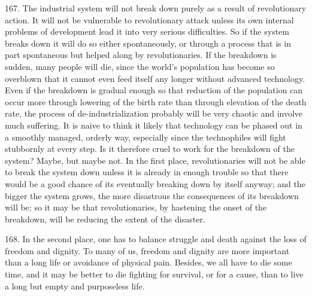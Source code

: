 \documentclass{article}
\begin{document}
\hspace{0.5cm} 167. The industrial system will not break down purely as a result of revolutionary action. It will 
not be vulnerable to revolutionary attack unless its own internal problems of development lead it 
into very serious difficulties. So if the system breaks down it will do so either spontaneously, or 
through a process that is in part spontaneous but helped along by revolutionaries. If the breakdown 
is sudden, many people will die, since the world’s population has become so overblown that it 
cannot even feed itself any longer without advanced technology. Even if the breakdown is gradual 
enough so that reduction of the population can occur more through lowering of the birth rate than 
through elevation of the death rate, the process of de-industrialization probably will be very chaotic 
and involve much suffering. It is naive to think it likely that technology can be phased out in a 
smoothly managed, orderly way, especially since the technophiles will fight stubbornly at every 
step. Is it therefore cruel to work for the breakdown of the system? Maybe, but maybe not. In the 
first place, revolutionaries will not be able to break the system down unless it is already in enough 
trouble so that there would be a good chance of its eventually breaking down by itself anyway; 
and the bigger the system grows, the more disastrous the consequences of its breakdown will be; 
so it may be that revolutionaries, by hastening the onset of the breakdown, will be reducing the 
extent of the disaster. \vspace{\baselineskip}

168. In the second place, one has to balance struggle and death against the loss of freedom and 
dignity. To many of us, freedom and dignity are more important than a long life or avoidance of 
physical pain. Besides, we all have to die some time, and it may be better to die fighting for 
survival, or for a cause, than to live a long but empty and purposeless life. \vspace{\baselineskip}
\end{document}
